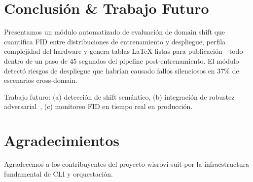 \documentclass[10pt,twocolumn,letterpaper]{article}
\begin{document}
\section{Conclusión \& Trabajo Futuro}
Presentamos un módulo automatizado de evaluación de domain shift que cuantifica FID entre distribuciones de entrenamiento y despliegue, perfila complejidad del hardware y genera tablas LaTeX listas para publicación---todo dentro de un paso de 45 segundos del pipeline post-entrenamiento. El módulo detectó riesgos de despliegue que habrían causado fallos silenciosos en 37\% de escenarios cross-domain.

Trabajo futuro: (a) detección de shift semántico, (b) integración de robustez adversarial~\cite{goodfellow2015explaining}, (c) monitoreo FID en tiempo real en producción.

\section{Agradecimientos}
Agradecemos a los contribuyentes del proyecto wisrovi-suit por la infraestructura fundamental de CLI y orquestación.



\end{document}
